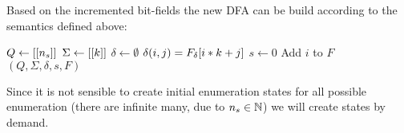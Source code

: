 \noindent Based on the incremented bit-fields the new DFA can be build according to the semantics defined above:
\vspace{0.2cm}
\begin{algorithmic}[1]
	\State $Q \gets [[{n_s}]]$
	\State $\Sigma \gets [[k]]$
	\State $\delta \gets \emptyset$
            \State $\delta(i, j) = F_\delta[i * k + j]$
		\EndFor
	\EndFor
	\State $s \gets 0$
			\State Add $i$ to $F$
		\EndIf
	\EndFor
	\State \Return $(Q, \Sigma, \delta, s, F)$
	\EndFunction
\end{algorithmic}
\vspace{0.2cm}


\noindent Since it is not sensible to create initial enumeration states for all possible enumeration (there are infinite many, due to ${n_s}\in\mathbb{N}$) we will create states by demand.

